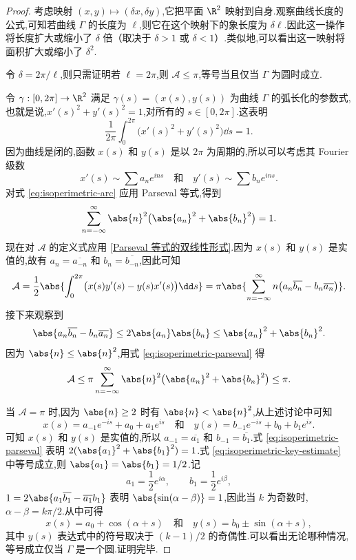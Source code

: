 \begin{proof}
考虑映射 $(x,y)\mapsto(\delta x,\delta y)$,它把平面 $\R^2$ 映射到自身.观察曲线长度的公式,可知若曲线 $\Gamma$ 的长度为 $\ell$,则它在这个映射下的象长度为 $\delta\ell$.因此这一操作将长度扩大或缩小了 $\delta$ 倍（取决于 $\delta>1$ 或 $\delta<1$）.类似地,可以看出这一映射将面积扩大或缩小了 $\delta^2$.

令 $\delta=2\pi/\ell$,则只需证明若 $\ell=2\pi$,则 $\mathcal A\leq\pi$,等号当且仅当 $\Gamma$ 为圆时成立.
	
	令 $\gamma:[0,2\pi]\to\R^2$ 满足 $\gamma(s)=(x(s),y(s))$ 为曲线 $\Gamma$ 的弧长化的参数式,也就是说,$x'(s)^2+y'(s)^2=1$,对所有的 $s\in[0,2\pi]$.这表明
	\begin{equation}\label{eq:isoperimetric-arc}
		\frac1{2\pi}\int_0^{2\pi}\bigl(x'(s)^2+y'(s)^2\bigr)\dd s=1.
	\end{equation}
	因为曲线是闭的,函数 $x(s)$ 和 $y(s)$ 是以 $2\pi$ 为周期的,所以可以考虑其 Fourier 级数
	\[
	x'(s)\sim\sum a_ne^{ins}
	\quad\text{和}\quad
	y'(s)\sim\sum b_ne^{ins}.
	\]
	对式 \eqref{eq:isoperimetric-arc} 应用 Parseval 等式,得到
	\begin{equation}\label{eq:isoperimetric-parseval}
		\sum_{n=-\infty}^{\infty}\abs{n}^2\bigl(\abs{a_n}^2+\abs{b_n}^2\bigr)=1.
	\end{equation}
	现在对 $\mathcal A$ 的定义式应用 \ref{Parseval 等式的双线性形式}.因为 $x(s)$ 和 $y(s)$ 是实值的,故有 $a_n=\overline{a_{-n}}$ 和 $b_n=\overline{b_{-n}}$,因此可知
	\[
	\mathcal A
	=\frac12\abs{\int_0^{2\pi}\bigl(x(s)y'(s)-y(s)x'(s)\bigr)\dd s}
	=\pi\abs{\sum_{n=-\infty}^{\infty}n\bigl(a_n\overline{b_n}-b_n\overline{a_n}\bigr)}.
	\]
	接下来观察到
	\begin{equation}\label{eq:isoperimetric-key-estimate}
		\abs{a_n\overline{b_n}-b_n\overline{a_n}}
		\leq2\abs{a_n}\abs{b_n}
		\leq\abs{a_n}^2+\abs{b_n}^2.
	\end{equation}
	因为 $\abs{n}\leq\abs{n}^2$,用式 \eqref{eq:isoperimetric-parseval} 得
	\[
	\mathcal A
	\leq\pi\sum_{n=-\infty}^{\infty}\abs{n}^2\bigl(\abs{a_n}^2+\abs{b_n}^2\bigr)
	\leq\pi.
	\]
	
	当 $\mathcal A=\pi$ 时,因为 $\abs{n}\geq2$ 时有 $\abs{n}<\abs{n}^2$,从上述讨论中可知
	\[
	x(s)=a_{-1}e^{-is}+a_0+a_1e^{is}
	\quad\text{和}\quad
	y(s)=b_{-1}e^{-is}+b_0+b_1e^{is}.
	\]
	可知 $x(s)$ 和 $y(s)$ 是实值的,所以 $a_{-1}=\overline{a_1}$ 和 $b_{-1}=\overline{b_1}$.式 \eqref{eq:isoperimetric-parseval} 表明 $2(\abs{a_1}^2+\abs{b_1}^2)=1$.式 \eqref{eq:isoperimetric-key-estimate} 中等号成立,则 $\abs{a_1}=\abs{b_1}=1/2$.记
	\[
	a_1=\frac12e^{i\alpha},
	\qquad
	b_1=\frac12e^{i\beta},
	\]
	$1=2\abs{a_1\overline{b_1}-\overline{a_1}b_1}$ 表明 $\abs{\sin(\alpha-\beta)}=1$,因此当 $k$ 为奇数时,$\alpha-\beta=k\pi/2$.从中可得
	\[
	x(s)=a_0+\cos(\alpha+s)
	\quad\text{和}\quad
	y(s)=b_0\pm\sin(\alpha+s),
	\]
	其中 $y(s)$ 表达式中的符号取决于 $(k-1)/2$ 的奇偶性.可以看出无论哪种情况,等号成立仅当 $\Gamma$ 是一个圆.证明完毕.
\end{proof}
\newpage
